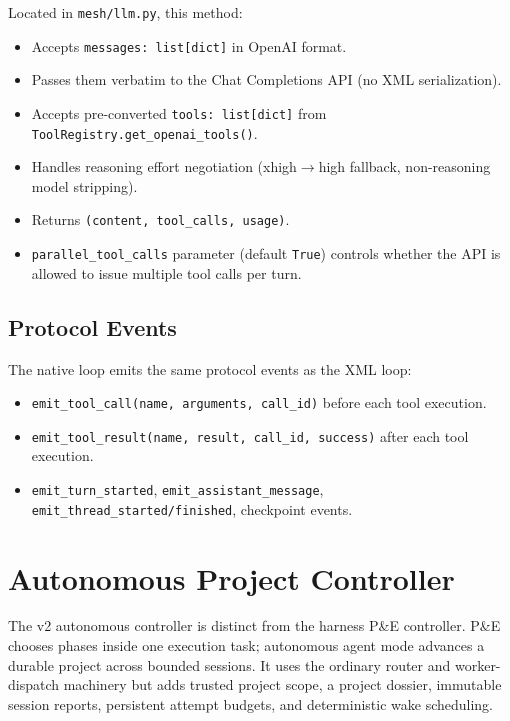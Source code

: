 \documentclass[11pt,letterpaper]{report}
\newcommand{\code}[1]{\texttt{#1}}
\begin{document}
Located in \code{mesh/llm.py}, this method:
\begin{itemize}
  \item Accepts \code{messages: list[dict]} in OpenAI format.
  \item Passes them verbatim to the Chat Completions API (no XML
    serialization).
  \item Accepts pre-converted \code{tools: list[dict]} from
    \code{ToolRegistry.get\_openai\_tools()}.
  \item Handles reasoning effort negotiation (xhigh$\to$high fallback,
    non-reasoning model stripping).
  \item Returns \code{(content, tool\_calls, usage)}.
  \item \code{parallel\_tool\_calls} parameter (default \code{True})
    controls whether the API is allowed to issue multiple tool calls per
    turn.
\end{itemize}

\section{Protocol Events}

The native loop emits the same protocol events as the XML loop:
\begin{itemize}
  \item \code{emit\_tool\_call(name, arguments, call\_id)} before each tool
    execution.
  \item \code{emit\_tool\_result(name, result, call\_id, success)} after
    each tool execution.
  \item \code{emit\_turn\_started}, \code{emit\_assistant\_message},
    \code{emit\_thread\_started/finished}, checkpoint events.
\end{itemize}


\chapter{Autonomous Project Controller}
\label{ch:autonomous-controller}

The v2 autonomous controller is distinct from the harness P\&E controller.
P\&E chooses phases inside one execution task; autonomous agent mode advances
a durable project across bounded sessions. It uses the ordinary router and
worker-dispatch machinery but adds trusted project scope, a project dossier,
immutable session reports, persistent attempt budgets, and deterministic
wake scheduling.
\end{document}
